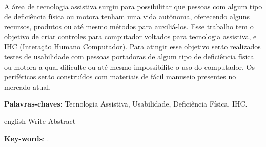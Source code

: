 \documentclass[
	12pt,			%
	openright,		%
	oneside,			%
	a4paper,			%
	chapter=TITLE,		%
	english,			%
	brazil,			%
	]{abntex2}
\begin{document}

%
%
%
%



\begin{resumo}
	A área de tecnologia assistiva surgiu para possibilitar que pessoas com algum tipo de deficiência física ou motora tenham uma vida autônoma, oferecendo	alguns recursos, produtos ou até mesmo métodos para auxiliá-los. Esse trabalho tem o objetivo de criar controles para computador voltados para tecnologia assistiva, e IHC (Interação Humano Computador). Para atingir esse objetivo serão realizados testes de usabilidade com pessoas portadoras de algum tipo de deficiência física ou motora a qual dificulte ou até mesmo impossibilite o uso do computador. Os periféricos serão construídos com materiais de fácil manuseio presentes no mercado atual.

\vspace{\onelineskip}
\noindent
\textbf{Palavras-chaves}: Tecnologia Assistiva, Usabilidade, Deficiência Física, IHC.
\end{resumo}

\begin{resumo}[Abstract]
\begin{otherlanguage*}{english}
Write Abstract

\vspace{\onelineskip}
\noindent
\textbf{Key-words}: .
\end{otherlanguage*}
\end{resumo}
\end{document}
